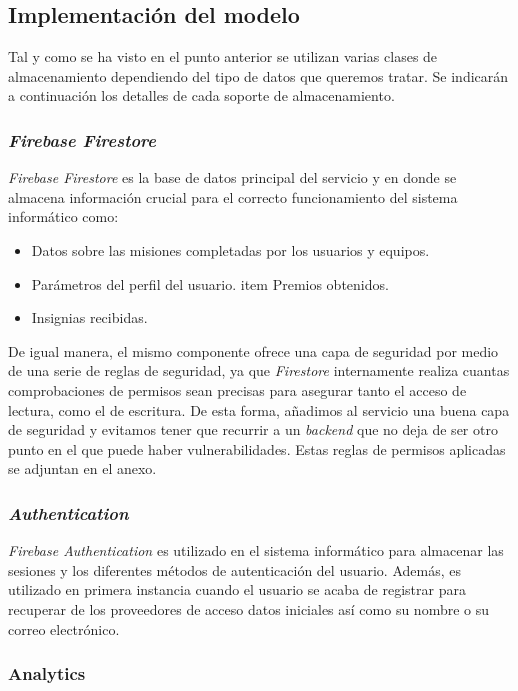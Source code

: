\documentclass[twoside]{report}
\begin{document}
\subsection{Implementación del modelo}

Tal y como se ha visto en el punto anterior se utilizan varias clases de almacenamiento dependiendo del tipo de datos que queremos tratar. Se indicarán a continuación los detalles de cada soporte de almacenamiento.

\subsubsection{\textit{Firebase Firestore}}

\textit{Firebase Firestore} es la base de datos principal del servicio y en donde se almacena información crucial para el correcto funcionamiento del sistema informático como:
\begin{itemize}
\item Datos sobre las misiones completadas por los usuarios y equipos.
\item Parámetros del perfil del usuario.
item Premios obtenidos.
\item Insignias recibidas.
\end{itemize} 

De igual manera, el mismo componente ofrece una capa de seguridad por medio de una serie de reglas de seguridad, ya que \textit{Firestore} internamente realiza cuantas comprobaciones de permisos sean precisas para asegurar tanto el acceso de lectura, como el de escritura. De esta forma, añadimos al servicio una buena capa de seguridad  y evitamos tener que recurrir a un \textit{backend} que no deja de ser otro punto en el que puede haber vulnerabilidades. Estas reglas de permisos aplicadas se adjuntan en el anexo.

\subsubsection{\textit{Authentication}}

\textit{Firebase Authentication} es utilizado en el sistema informático para almacenar las sesiones y los diferentes métodos de autenticación del usuario. Además, es utilizado en primera instancia cuando el usuario se acaba de registrar para recuperar de los proveedores de acceso datos iniciales así como su nombre o su correo electrónico.

\subsubsection{Analytics}
\end{document}
